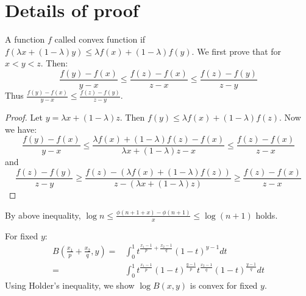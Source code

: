 \section{Details of proof}
A function $f$ called convex function if $f(\lambda x+(1-\lambda)y)\leq \lambda f(x)+(1-\lambda)f(y)$. We first prove that for $x<y<z$. Then:
\begin{equation*}
    \frac{f(y)-f(x)}{y-x}\leq \frac{f(z)-f(x)}{z-x}\leq \frac{f(z)-f(y)}{z-y}
\end{equation*}
Thus $\frac{f(y)-f(x)}{y-x}\leq\frac{f(z)-f(y)}{z-y}$.
\begin{proof}
    Let $y=\lambda x+(1-\lambda)z$. Then $f(y)\leq \lambda f(x)+(1-\lambda)f(z)$. Now we have:
    \begin{equation*}
        \frac{f(y)-f(x)}{y-x}\leq \frac{\lambda f(x)+(1-\lambda)f(z)-f(x)}{\lambda x+(1-\lambda)z-x}\leq\frac{f(z)-f(x)}{z-x}
    \end{equation*}
    and
    \begin{equation*}
        \frac{f(z)-f(y)}{z-y}\geq \frac{f(z)-(\lambda f(x)+(1-\lambda)f(z))}{z-(\lambda x+(1-\lambda)z)}\geq\frac{f(z)-f(x)}{z-x}
    \end{equation*}
\end{proof}
By above inequality, $\log n\leq \frac{\phi(n+1+x)-\phi(n+1)}{x}\leq \log (n+1)$ holds.
\begin{note}        
    For fixed $y$:
    \begin{align*}
        B(\frac{x_1}{p}+\frac{x_2}{q},y)=&\int_{0}^{1}t^{\frac{x_1-1}{p}+\frac{x_2-1}{q}}(1-t)^{y-1}dt\\
        =&\int_{0}^{1}t^{\frac{x_1-1}{p}}(1-t)^\frac{y-1}{p}t^{\frac{x_2-1}{q}}(1-t)^\frac{y-1}{q}dt
    \end{align*}
    Using Holder's inequality, we show $\log B(x,y)$ is convex for fixed $y$.
\end{note}      
% 


